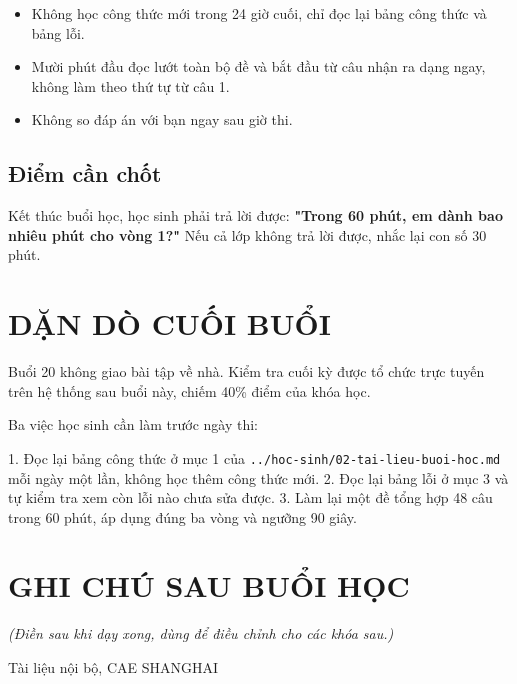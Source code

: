 \documentclass[11pt, a4paper]{article}
\begin{document}
\begin{itemize}[leftmargin=1.4em, itemsep=2pt]
\item Không học công thức mới trong 24 giờ cuối, chỉ đọc lại bảng công thức và bảng lỗi.
\item Mười phút đầu đọc lướt toàn bộ đề và bắt đầu từ câu nhận ra dạng ngay, không làm theo thứ tự từ câu 1.
\item Không so đáp án với bạn ngay sau giờ thi.
\end{itemize}

\subsection{Điểm cần chốt}

Kết thúc buổi học, học sinh phải trả lời được: \textbf{"Trong 60 phút, em dành bao nhiêu phút cho vòng 1?"} Nếu cả lớp không trả lời được, nhắc lại con số 30 phút.

\section{DẶN DÒ CUỐI BUỔI}

Buổi 20 không giao bài tập về nhà. Kiểm tra cuối kỳ được tổ chức trực tuyến trên hệ thống sau buổi này, chiếm 40\% điểm của khóa học.

Ba việc học sinh cần làm trước ngày thi:

1. Đọc lại bảng công thức ở mục 1 của \texttt{../hoc-sinh/02-tai-lieu-buoi-hoc.md} mỗi ngày một lần, không học thêm công thức mới.
2. Đọc lại bảng lỗi ở mục 3 và tự kiểm tra xem còn lỗi nào chưa sửa được.
3. Làm lại một đề tổng hợp 48 câu trong 60 phút, áp dụng đúng ba vòng và ngưỡng 90 giây.

\section{GHI CHÚ SAU BUỔI HỌC}

\emph{(Điền sau khi dạy xong, dùng để điều chỉnh cho các khóa sau.)}

\vspace{0.8cm}
\begin{center}
{\footnotesize\color{cae_blue} Tài liệu nội bộ, CAE SHANGHAI}
\end{center}
\end{document}
